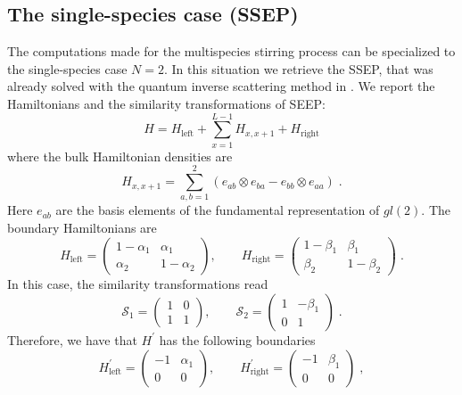 \documentclass[10pt]{article}
\numberwithin{equation}{section}
\numberwithin{equation}{subsection}
\newcommand{\co}{\;,}
\newcommand{\dt}{\;.}
\begin{document}
\subsection{The single-species case (SSEP)}
The computations made for the multispecies stirring process can be specialized to the single-species case $N=2$. In this situation we retrieve the SSEP, that was already solved with the quantum inverse scattering method in \cite{frassek2020eigenstates}. We report the Hamiltonians and the similarity transformations of SEEP: 
\begin{equation}
	H=H_{\text{left}}+\sum_{x=1}^{L-1}H_{x,x+1}+H_{\text{right}}
\end{equation}
where the bulk Hamiltonian densities are 
\begin{equation}
	H_{x,x+1}=\sum_{a,b=1}^{2}\left(e_{ab}\otimes e_{ba}-e_{bb}\otimes e_{aa}\right)\dt
\end{equation}
Here $e_{ab}$ are the basis elements of the fundamental representation of $gl(2)$. The boundary Hamiltonians are
\begin{equation}
	H_{\text{left}}=\begin{pmatrix}
		1-\alpha_{1}&\alpha_{1}\\
		\alpha_{2}&1-\alpha_{2}
	\end{pmatrix},\qquad H_{\text{right}}=\begin{pmatrix}
	1-\beta_{1}&\beta_{1}\\
	\beta_{2}&1-\beta_{2}
\end{pmatrix}\dt
\end{equation}
In this case, the similarity transformations read
\begin{equation}
	\mathcal{S}_{1}=\begin{pmatrix}
		1&0\\
		1&1
	\end{pmatrix},\qquad \mathcal{S}_{2}=\begin{pmatrix}
	1&-\beta_{1}\\
	0&1
\end{pmatrix}\dt
\end{equation}
Therefore, we have that $H^{'}$ has the following boundaries
\begin{equation}
	H^{'}_{\text{left}}=\begin{pmatrix}
		-1&\alpha_{1}\\
		0&0
	\end{pmatrix},\qquad H^{'}_{\text{right}}=\begin{pmatrix}
	-1&\beta_{1}\\
	0&0
\end{pmatrix}\co
\end{equation}
\end{document}
